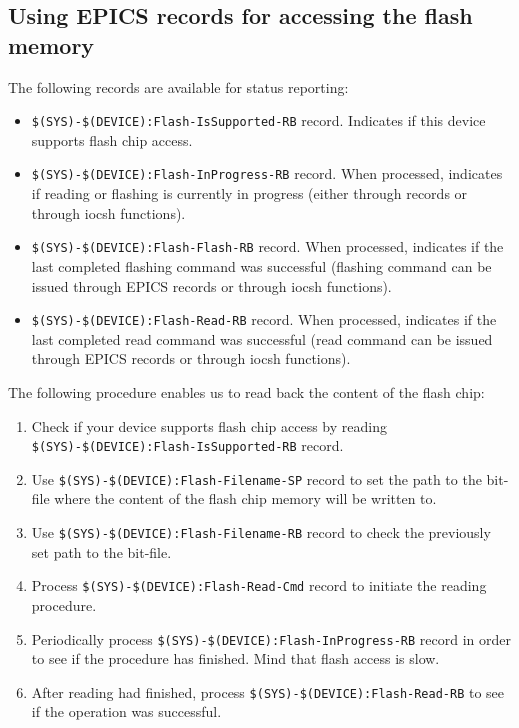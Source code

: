 \documentclass[12pt,a4paper]{article}
\begin{document}
\subsection{Using EPICS records for accessing the flash memory}
The following records are available for status reporting:
\begin{itemize}
	\item \texttt{\$(SYS)-\$(DEVICE):Flash-IsSupported-RB} record. Indicates if this device supports flash chip access.
	\item \texttt{\$(SYS)-\$(DEVICE):Flash-InProgress-RB} record. When processed, indicates if reading or flashing is currently in progress (either through records or through iocsh functions).
	\item \texttt{\$(SYS)-\$(DEVICE):Flash-Flash-RB} record. When processed, indicates if the last completed flashing command was successful (flashing command can be issued through EPICS records or through iocsh functions).
	\item \texttt{\$(SYS)-\$(DEVICE):Flash-Read-RB} record. When processed, indicates if the last completed read command was successful (read command can be issued through EPICS records or through iocsh functions).
\end{itemize}

The following procedure enables us to read back the content of the flash chip:
\begin{enumerate}
	\item Check if your device supports flash chip access by reading \newline\texttt{\$(SYS)-\$(DEVICE):Flash-IsSupported-RB} record.
	\item Use \texttt{\$(SYS)-\$(DEVICE):Flash-Filename-SP} record to set the path to the bit-file where the content of the flash chip memory will be written to.
	\item Use \texttt{\$(SYS)-\$(DEVICE):Flash-Filename-RB} record to check the previously set path to the bit-file.
	\item Process \texttt{\$(SYS)-\$(DEVICE):Flash-Read-Cmd} record to initiate the reading procedure. 
	\item Periodically process \texttt{\$(SYS)-\$(DEVICE):Flash-InProgress-RB} record in order to see if the procedure has finished. Mind that flash access is slow.
	\item After reading had finished, process \texttt{\$(SYS)-\$(DEVICE):Flash-Read-RB} to see if the operation was successful.
\end{enumerate}
\end{document}
